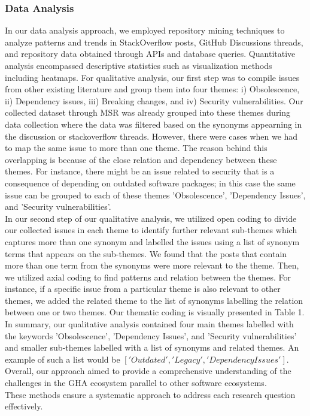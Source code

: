 \documentclass[conference]{IEEEtran}
\begin{document}
            \subsubsection{\textbf{Data Analysis}}
                In our data analysis approach, we employed repository mining techniques to analyze patterns and trends in StackOverflow posts, GitHub Discussions threads, and repository data obtained through APIs and database queries. Quantitative analysis encompassed descriptive statistics such as visualization methods including heatmaps. For qualitative analysis, our first step was to compile issues from other existing literature and group them into four themes: i) Obsolescence, ii) Dependency issues, iii) Breaking changes, and iv) Security vulnerabilities. Our collected dataset through MSR was already grouped into these themes during data collection where the data was filtered based on the synonyms appearning in the discussion or stackoverflow threads. However, there were cases when we had to map the same issue to more than one theme. The reason behind this overlapping is because of the close relation and dependency between these themes. For instance, there might be an issue related to security that is a consequence of depending on outdated software packages; in this case the same issue can be grouped to each of these themes 'Obsolescence', 'Dependency Issues', and 'Security vulnerabilities'. \\
                In our second step of our qualitative analysis, we utilized open coding to divide our collected issues in each theme to identify further relevant sub-themes which captures more than one synonym and labelled the issues using a list of synonym terms that appears on the sub-themes. We found that the posts that contain more than one term from the synonyms were more relevant to the theme. Then, we utilized axial coding to find patterns and relation between the themes. For instance, if a specific issue from a particular theme is also relevant to other themes,  we added the related theme to the list of synonyms labelling the relation between one or two themes. Our thematic coding is visually presented in Table 1.\\
                In summary, our qualitative analysis contained four main themes labelled with the keywords  'Obsolescence', 'Dependency Issues', and 'Security vulnerabilities' and smaller sub-themes labelled with a list of synonyms and related themes. An example of such a list would be $['Outdated', 'Legacy', 'Dependency Issues' ]$. Overall, our approach aimed to provide a comprehensive understanding of the challenges in the GHA ecosystem parallel to other software ecosystems.\\
These methods ensure a systematic approach to address each research question effectively.\\
\end{document}
